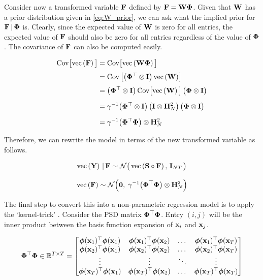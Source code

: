 Consider now a transformed variable $\mathbf{F}$ defined by $\mathbf{F} = \mathbf{W} \mathbf{\Phi}$. Given that $\mathbf{W}$ has a prior distribution given in \cref{eq:W_prior}, we can ask what the implied prior for $\mathbf{F} \, | \, \mathbf{\Phi}$ is. Clearly, since the expected value of $\mathbf{W}$ is zero for all entries, the expected value of $\mathbf{F}$ should also be zero for all entries regardless of the value of $\mathbf{\Phi}$. The covariance of $\mathbf{F}$ can also be computed easily. 

\begin{align*}
    \text{Cov}\big[\text{\textup{vec}}\left(\mathbf{F}\right)\big] &= \text{Cov}\big[\text{\textup{vec}}\left(\mathbf{W} \mathbf{\Phi}\right)\big] \\[0.1cm]
    &= \text{Cov}\left[\big(\mathbf{\Phi}^\top \otimes \mathbf{I}\big) \, \text{\textup{vec}}\left(\mathbf{W}\right)\right] \\[0.1cm]
    &= \big(\mathbf{\Phi}^\top \otimes \mathbf{I}\big) \, \text{Cov}\big[\text{\textup{vec}}\left(\mathbf{W}\right)\big] \, \big(\mathbf{\Phi} \otimes \mathbf{I}\big) \\[0.2cm]
    &= \gamma^{-1}  \big(\mathbf{\Phi}^\top \otimes \mathbf{I}\big) \, \big(\mathbf{I} \otimes \mathbf{H}_N^{2} \big) \, \big(\mathbf{\Phi} \otimes \mathbf{I}\big) \\[0.2cm]
    &= \gamma^{-1} \big( \mathbf{\Phi}^\top \mathbf{\Phi} \big) \otimes \mathbf{H}_N^2
\end{align*}

Therefore, we can rewrite the model in terms of the new transformed variable as follows. 

\begin{equation}
    \text{\textup{vec}}\left(\mathbf{Y}\right) \, | \, \mathbf{F} \sim \mathcal{N}\big(\, \text{\textup{vec}}\left(\mathbf{S} \circ \mathbf{F}\right), \, \mathbf{I}_{NT} \, \big)
\end{equation}

\begin{equation}
    \label{eq:F_prior2}
    \text{\textup{vec}}\left(\mathbf{F}\right) \sim \mathcal{N}\Big(\mathbf{0}, \; \gamma^{-1} \big(\mathbf{\Phi}^\top \mathbf{\Phi} \big) \otimes \mathbf{H}_N^{2}\Big)
\end{equation}


The final step to convert this into a non-parametric regression model is to apply the `kernel-trick' \citep{Scholkopf2018}. Consider the PSD matrix $\mathbf{\Phi}^\top \mathbf{\Phi}$. Entry $(i, j)$ will be the inner product between the basis function expansion of $\mathbf{x}_i$ and $\mathbf{x}_j$. 

\begin{equation}
    \mathbf{\Phi}^\top \mathbf{\Phi} \in \mathbb{R}^{T \times T} = 
    \begin{bmatrix} 
        \boldsymbol{\phi}(\mathbf{x}_1)^\top\boldsymbol{\phi}(\mathbf{x}_1) & \boldsymbol{\phi}(\mathbf{x}_1)^\top\boldsymbol{\phi}(\mathbf{x}_2) & \dots & \boldsymbol{\phi}(\mathbf{x}_1)^\top\boldsymbol{\phi}(\mathbf{x}_T) \\
        \boldsymbol{\phi}(\mathbf{x}_2)^\top\boldsymbol{\phi}(\mathbf{x}_1) & \boldsymbol{\phi}(\mathbf{x}_2)^\top\boldsymbol{\phi}(\mathbf{x}_2) & \dots & \boldsymbol{\phi}(\mathbf{x}_2)^\top\boldsymbol{\phi}(\mathbf{x}_T) \\
        \vdots & \vdots & \ddots & \vdots  \\
        \boldsymbol{\phi}(\mathbf{x}_T)^\top\boldsymbol{\phi}(\mathbf{x}_1) & \boldsymbol{\phi}(\mathbf{x}_T)^\top\boldsymbol{\phi}(\mathbf{x}_2) & \dots & \boldsymbol{\phi}(\mathbf{x}_T)^\top\boldsymbol{\phi}(\mathbf{x}_T) \\
    \end{bmatrix}
\end{equation}

